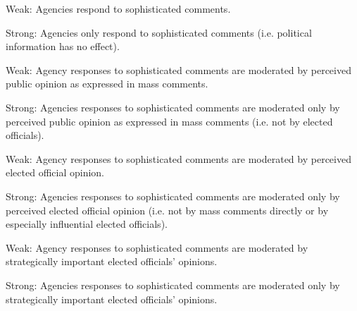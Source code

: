 \begin{subhyp}

\begin{hyp}\label{hyp:ds}
Weak: Agencies respond to sophisticated comments.

Strong: Agencies only respond to sophisticated comments (i.e. political information has no effect).
\end{hyp}

\begin{hyp}\label{hyp:dn}
Weak: Agency responses to sophisticated comments are moderated by perceived public opinion as expressed in mass comments.

Strong: Agencies responses to sophisticated comments are moderated only by perceived public opinion as expressed in mass comments (i.e. not by elected officials).
\end{hyp}

\begin{hyp}\label{hyp:in}
Weak: Agency responses to sophisticated comments are moderated by perceived elected official opinion.

Strong: Agencies responses to sophisticated comments are moderated only by perceived elected official opinion (i.e. not by mass comments directly or by especially influential elected officials).
\end{hyp}

\begin{hyp}\label{hyp:is}
Weak: Agency responses to sophisticated comments are moderated by strategically important elected officials' opinions.

Strong: Agencies responses to sophisticated comments are moderated only by strategically important elected officials' opinions.
\end{hyp}

\end{subhyp}




